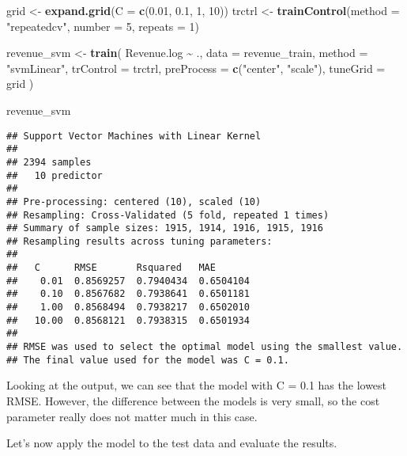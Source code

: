 \documentclass[
]{article}
\newenvironment{Shaded}{\begin{snugshade}}{\end{snugshade}}
\newcommand{\AttributeTok}[1]{\textcolor[rgb]{0.13,0.29,0.53}{#1}}
\newcommand{\DecValTok}[1]{\textcolor[rgb]{0.00,0.00,0.81}{#1}}
\newcommand{\FloatTok}[1]{\textcolor[rgb]{0.00,0.00,0.81}{#1}}
\newcommand{\FunctionTok}[1]{\textcolor[rgb]{0.13,0.29,0.53}{\textbf{#1}}}
\newcommand{\NormalTok}[1]{#1}
\newcommand{\OtherTok}[1]{\textcolor[rgb]{0.56,0.35,0.01}{#1}}
\newcommand{\SpecialCharTok}[1]{\textcolor[rgb]{0.81,0.36,0.00}{\textbf{#1}}}
\newcommand{\StringTok}[1]{\textcolor[rgb]{0.31,0.60,0.02}{#1}}
\begin{document}
\begin{Shaded}
\begin{Highlighting}[]
\NormalTok{grid }\OtherTok{\textless{}{-}} \FunctionTok{expand.grid}\NormalTok{(}\AttributeTok{C =} \FunctionTok{c}\NormalTok{(}\FloatTok{0.01}\NormalTok{, }\FloatTok{0.1}\NormalTok{, }\DecValTok{1}\NormalTok{, }\DecValTok{10}\NormalTok{))}
\NormalTok{trctrl }\OtherTok{\textless{}{-}} \FunctionTok{trainControl}\NormalTok{(}\AttributeTok{method =} \StringTok{"repeatedcv"}\NormalTok{, }\AttributeTok{number =} \DecValTok{5}\NormalTok{, }\AttributeTok{repeats =} \DecValTok{1}\NormalTok{)}

\NormalTok{revenue\_svm }\OtherTok{\textless{}{-}} \FunctionTok{train}\NormalTok{(}
\NormalTok{    Revenue.log }\SpecialCharTok{\textasciitilde{}}\NormalTok{ ., }\AttributeTok{data =}\NormalTok{ revenue\_train, }\AttributeTok{method =} \StringTok{"svmLinear"}\NormalTok{,}
    \AttributeTok{trControl =}\NormalTok{ trctrl,}
    \AttributeTok{preProcess =} \FunctionTok{c}\NormalTok{(}\StringTok{"center"}\NormalTok{, }\StringTok{"scale"}\NormalTok{),}
    \AttributeTok{tuneGrid =}\NormalTok{ grid}
\NormalTok{)}

\NormalTok{revenue\_svm}
\end{Highlighting}
\end{Shaded}

\begin{verbatim}
## Support Vector Machines with Linear Kernel 
## 
## 2394 samples
##   10 predictor
## 
## Pre-processing: centered (10), scaled (10) 
## Resampling: Cross-Validated (5 fold, repeated 1 times) 
## Summary of sample sizes: 1915, 1914, 1916, 1915, 1916 
## Resampling results across tuning parameters:
## 
##   C      RMSE       Rsquared   MAE      
##    0.01  0.8569257  0.7940434  0.6504104
##    0.10  0.8567682  0.7938641  0.6501181
##    1.00  0.8568494  0.7938217  0.6502010
##   10.00  0.8568121  0.7938315  0.6501934
## 
## RMSE was used to select the optimal model using the smallest value.
## The final value used for the model was C = 0.1.
\end{verbatim}

Looking at the output, we can see that the model with C = 0.1 has the
lowest RMSE. However, the difference between the models is very small,
so the cost parameter really does not matter much in this case.

Let's now apply the model to the test data and evaluate the results.
\end{document}
